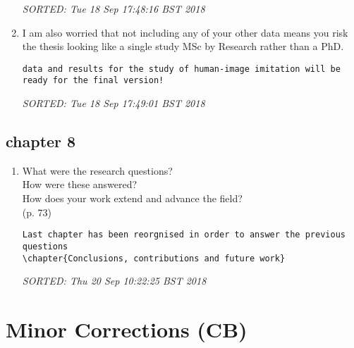 \documentclass[10pt]{article}
\begin{document}
\begin{enumerate}[noitemsep,topsep=0pt]
\begin{verbatim}
\end{verbatim}
\textit{
SORTED: 
Tue 18 Sep 17:48:16 BST 2018
}
\\





\item	I am also worried that not including any of  your other data
	means you risk the thesis looking like a single study 
	MSc by Research rather than a PhD.



\begin{verbatim}
data and results for the study of human-image imitation will be 
ready for the final version!
\end{verbatim}
\textit{
SORTED: 
Tue 18 Sep 17:49:01 BST 2018
}
\\



\end{enumerate}



\subsection{chapter 8}

\begin{enumerate}[noitemsep,topsep=0pt]

\item What were the research questions? \\
	How were these answered?\\
	How does your work extend and advance the field?\\
	(p. 73)


\begin{verbatim}
Last chapter has been reorgnised in order to answer the previous questions
\chapter{Conclusions, contributions and future work}

\end{verbatim}
\textit{
SORTED: 
Thu 20 Sep 10:22:25 BST 2018
}
\\


\end{enumerate}







\section{Minor Corrections (CB)}
\end{document}

